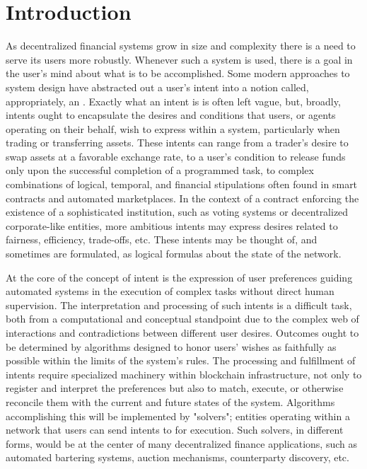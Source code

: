 \section{Introduction}\label{sec:introduction}

As decentralized financial systems grow in size and complexity there is a need to serve its users more robustly. Whenever such a system is used, there is a goal in the user's mind about what is to be accomplished. Some modern approaches to system design have abstracted out a user's intent into a notion called, appropriately, an . Exactly what an intent is is often left vague, but, broadly, intents ought to encapsulate the desires and conditions that users, or agents operating on their behalf, wish to express within a system, particularly when trading or transferring assets. These intents can range from a trader's desire to swap assets at a favorable exchange rate, to a user's condition to release funds only upon the successful completion of a programmed task, to complex combinations of logical, temporal, and financial stipulations often found in smart contracts and automated marketplaces. In the context of a contract enforcing the existence of a sophisticated institution, such as voting systems or decentralized corporate-like entities, more ambitious intents may express desires related to fairness, efficiency, trade-offs, etc. These intents may be thought of, and sometimes are formulated, as logical formulas about the state of the network.

At the core of the concept of intent is the expression of user preferences guiding automated systems in the execution of complex tasks without direct human supervision. The interpretation and processing of such intents is a difficult task, both from a computational and conceptual standpoint due to the complex web of interactions and contradictions between different user desires. Outcomes ought to be determined by algorithms designed to honor users' wishes as faithfully as possible within the limits of the system's rules. The processing and fulfillment of intents require specialized machinery within blockchain infrastructure, not only to register and interpret the preferences but also to match, execute, or otherwise reconcile them with the current and future states of the system. Algorithms accomplishing this will be implemented by "solvers"; entities operating within a network that users can send intents to for execution. Such solvers, in different forms, would be at the center of many decentralized finance applications, such as automated bartering systems, auction mechanisms, counterparty discovery, etc.

